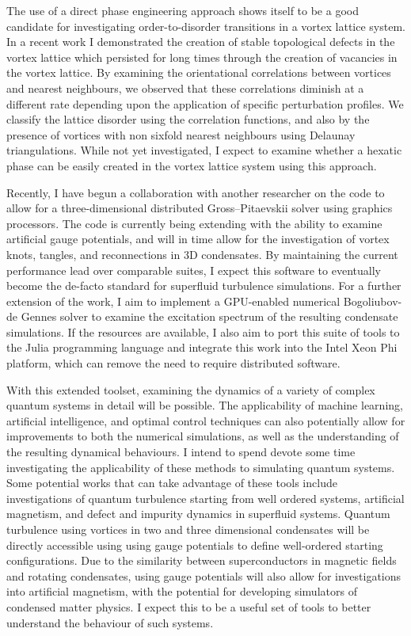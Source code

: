 \documentclass[12pt,a4paper,unicode]{moderncv}
\begin{document}
{    The use of a direct phase engineering approach shows itself to be a good candidate for investigating order-to-disorder transitions in a vortex lattice system. In a recent work I demonstrated the creation of stable topological defects in the vortex lattice which persisted for long times through the creation of vacancies in the vortex lattice. By examining the orientational correlations between vortices and nearest neighbours, we observed that these correlations diminish at a different rate depending upon the application of specific perturbation profiles. We classify the lattice disorder using the correlation functions, and also by the presence of vortices with non sixfold nearest neighbours using Delaunay triangulations. While not yet investigated, I expect to examine whether a hexatic phase can be easily created in the vortex lattice system using this approach.

    Recently, I have begun a collaboration with another researcher on the code to allow for a three-dimensional distributed Gross--Pitaevskii solver using graphics processors. The code is currently being extending with the ability to examine artificial gauge potentials, and will in time allow for the investigation of vortex knots, tangles, and reconnections in 3D condensates. By maintaining the current performance lead over comparable suites, I expect this software to eventually become the de-facto standard for superfluid turbulence simulations. For a further extension of the work, I aim to implement a GPU-enabled numerical Bogoliubov-de Gennes solver to examine the excitation spectrum of the resulting condensate simulations. If the resources are available, I also aim to port this suite of tools to the Julia programming language and integrate this work into the Intel Xeon Phi platform, which can remove the need to require distributed software.

    With this extended toolset, examining the dynamics of a variety of complex quantum systems in detail will be possible. The applicability of machine learning, artificial intelligence, and optimal control techniques can also potentially allow for improvements to both the numerical simulations, as well as the understanding of the resulting dynamical behaviours. I intend to spend devote some time investigating the applicability of these methods to simulating quantum systems. Some potential works that can take advantage of these tools include investigations of quantum turbulence starting from well ordered systems, artificial magnetism, and defect and impurity dynamics in superfluid systems. Quantum turbulence using vortices in two and three dimensional condensates will be directly accessible using using gauge potentials to define well-ordered starting configurations. Due to the similarity between superconductors in magnetic fields and rotating condensates, using gauge potentials will also allow for investigations into artificial magnetism, with the potential for developing simulators of condensed matter physics. I expect this to be a useful set of tools to better understand the behaviour of such systems.

}
\end{document}
